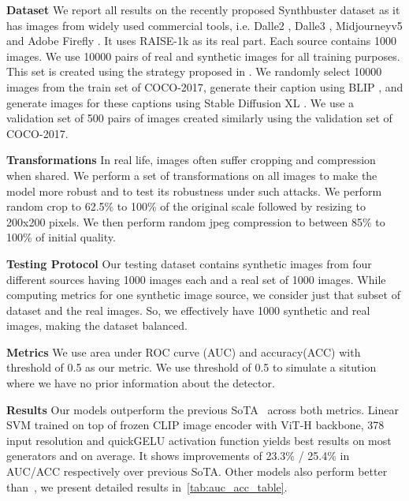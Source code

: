 \noindent\textbf{Dataset} We report all results on the recently proposed Synthbuster dataset \cite{bammey2023synthbuster} as it has images from widely used commercial tools, i.e. Dalle2 \cite{dalle2}, Dalle3 \cite{dalle3}, Midjourneyv5 \cite{midjourney} and Adobe Firefly \cite{firefly}. It uses RAISE-1k \cite{dang2015raise} as its real part. Each source contains 1000 images. We use 10000 pairs of real and synthetic images for all training purposes. This set is created using the strategy proposed in \cite{cozzolino2024raising}. We randomly select 10000 images from the train set of COCO-2017\cite{lin2014microsoft}, generate their caption using BLIP \cite{li2022blip}, and generate images for these captions using Stable Diffusion XL \cite{podell2023sdxl}. We use a validation set of 500 pairs of images created similarly using the validation set of COCO-2017.
 
\noindent\textbf{Transformations} In real life, images often suffer cropping and compression when shared. We perform a set of transformations on all images to make the model more robust and to test its robustness under such attacks. We perform random crop to 62.5\% to 100\% of the original scale followed by resizing to 200x200 pixels. We then perform random jpeg compression to between 85\% to 100\% of initial quality.

\noindent\textbf{Testing Protocol} Our testing dataset contains synthetic images from four different sources having 1000 images each and a real set of 1000 images. While computing metrics for one synthetic image source, we consider just that subset of dataset and the real images. So, we effectively have 1000 synthetic and real images, making the dataset balanced.


\noindent\textbf{Metrics} We use area under ROC curve (AUC) and accuracy(ACC) with threshold of 0.5 as our metric. We use threshold of 0.5 to simulate a sitution where we have no prior information about the detector.

\noindent\textbf{Results} Our models outperform the previous SoTA~\cite{cozzolino2024raising} across both metrics. Linear SVM trained on top of frozen CLIP image encoder with ViT-H backbone, 378 input resolution and quickGELU activation function yields best results on most generators and on average. It shows improvements of 23.3\% / 25.4\% in AUC/ACC respectively over previous SoTA. Other models also perform better than~\citet{cozzolino2024raising}, we present detailed results in~\cref{tab:auc_acc_table}.



